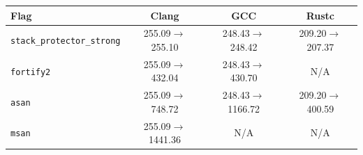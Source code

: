 \begin{tabular*}{\columnwidth}{@{\extracolsep\fill}lccc@{\extracolsep\fill}}
\toprule
\textbf{Flag} & \textbf{Clang} & \textbf{GCC} & \textbf{Rustc} \\
\midrule
\texttt{stack\_protector\_strong} & 255.09$\to$255.10 & 248.43$\to$248.42 & 209.20$\to$207.37 \\
\texttt{fortify2} & 255.09$\to$432.04 & 248.43$\to$430.70 & N/A \\
\texttt{asan} & 255.09$\to$748.72 & 248.43$\to$1166.72 & 209.20$\to$400.59 \\
\texttt{msan} & 255.09$\to$1441.36 & N/A & N/A \\
\bottomrule
\end{tabular*}
